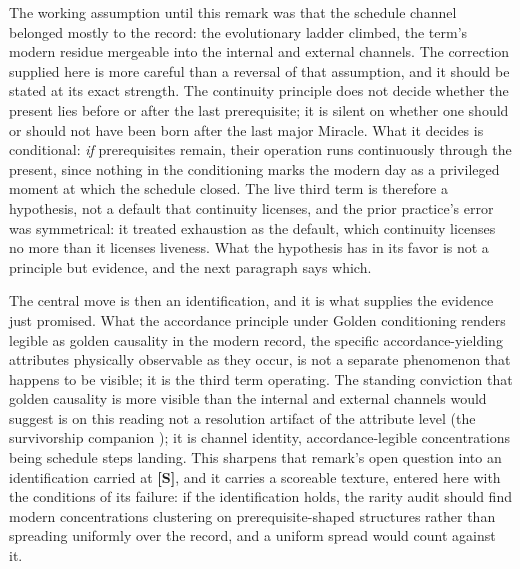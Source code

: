 \begin{remark}
\label{sch:rem:notexhausted}
The working assumption until this remark was that the schedule
channel belonged mostly to the record: the evolutionary ladder
climbed, the term's modern residue mergeable into the internal and
external channels. The correction supplied here is more
careful than a reversal of that assumption, and it should be stated
at its exact strength. The continuity principle does not decide
whether the present lies before or after the last prerequisite; it
is silent on whether one should or should not have been born after
the last major Miracle. What it decides is conditional: \emph{if}
prerequisites remain, their operation runs continuously through the
present, since nothing in the conditioning marks the modern day as
a privileged moment at which the schedule closed. The live third
term is therefore a hypothesis, not a default that continuity
licenses, and the prior practice's error was symmetrical: it treated
exhaustion as the default, which continuity licenses no more than
it licenses liveness. What the hypothesis has in its favor is not a
principle but evidence, and the next paragraph says which.

The central move is then an identification, and it is
what supplies the evidence just promised. What the
accordance principle under Golden conditioning renders legible as
golden causality in the modern record, the specific
accordance-yielding attributes physically observable as they occur,
is not a separate phenomenon that happens to be visible; it is the
third term operating. The standing conviction that golden causality
is more visible than the internal and external channels would
suggest is on this reading not a resolution artifact of the
attribute level (the survivorship companion \cite{GoldenSurvivorship}); it is
channel identity, accordance-legible concentrations being schedule
steps landing. This sharpens that remark's open question into an
identification carried at \textbf{[S]}, and it carries a scoreable
texture, entered here with the conditions of its failure: if the
identification holds, the rarity audit should find modern
concentrations clustering on prerequisite-shaped structures rather
than spreading uniformly over the record, and a uniform spread would
count against it.


\end{remark}
